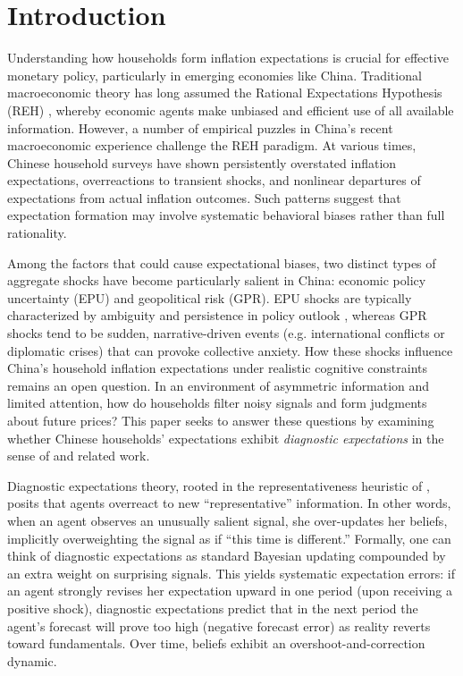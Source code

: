 \documentclass[12pt]{article}
\begin{document}
\section{Introduction}
Understanding how households form inflation expectations is crucial for effective monetary policy, particularly in emerging economies like China. Traditional macroeconomic theory has long assumed the Rational Expectations Hypothesis (REH) \cite{Muth1961}, whereby economic agents make unbiased and efficient use of all available information. However, a number of empirical puzzles in China's recent macroeconomic experience challenge the REH paradigm. At various times, Chinese household surveys have shown persistently overstated inflation expectations, overreactions to transient shocks, and nonlinear departures of expectations from actual inflation outcomes. Such patterns suggest that expectation formation may involve systematic behavioral biases rather than full rationality.

Among the factors that could cause expectational biases, two distinct types of aggregate shocks have become particularly salient in China: economic policy uncertainty (EPU) and geopolitical risk (GPR). EPU shocks are typically characterized by ambiguity and persistence in policy outlook \cite{Baker2016}, whereas GPR shocks tend to be sudden, narrative-driven events (e.g. international conflicts or diplomatic crises) that can provoke collective anxiety. How these shocks influence China's household inflation expectations under realistic cognitive constraints remains an open question. In an environment of asymmetric information and limited attention, how do households filter noisy signals and form judgments about future prices? This paper seeks to answer these questions by examining whether Chinese households' expectations exhibit \textit{diagnostic expectations} in the sense of \cite{Bordalo2018} and related work.

Diagnostic expectations theory, rooted in the representativeness heuristic of \cite{Kahneman1972}, posits that agents overreact to new “representative” information. In other words, when an agent observes an unusually salient signal, she over-updates her beliefs, implicitly overweighting the signal as if “this time is different.” Formally, one can think of diagnostic expectations as standard Bayesian updating compounded by an extra weight on surprising signals. This yields systematic expectation errors: if an agent strongly revises her expectation upward in one period (upon receiving a positive shock), diagnostic expectations predict that in the next period the agent's forecast will prove too high (negative forecast error) as reality reverts toward fundamentals. Over time, beliefs exhibit an overshoot-and-correction dynamic.
\end{document}
